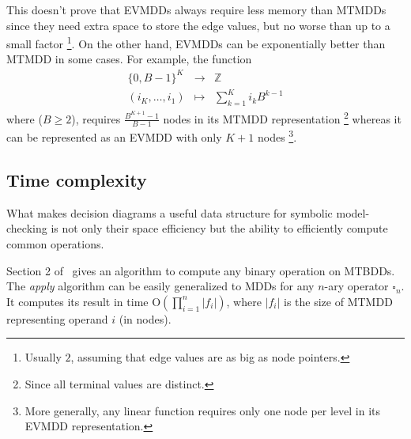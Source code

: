 \documentclass[a4paper,oneside,11pt,pdftex]{llncs}
\renewcommand{\O}[1]{\mathrm{O}\left(#1\right)}
\newcommand{\Z}{\mathbb{Z}}
\begin{document}
This doesn't prove that EVMDDs always require less memory than MTMDDs since
they need extra space to store the edge values, but no worse than up to a small factor
\footnote{Usually $2$, assuming that edge values are as
big as node pointers.}. On the other hand, EVMDDs can be exponentially better than
MTMDD in some cases. For example, the function
$$
\begin{array}{rcl}
  \{0, B-1\}^K&\rightarrow&\Z\\
  (i_K,\ldots, i_1)&\mapsto&\sum_{k=1}^{K} i_k B^{k-1}
\end{array}
$$
where ($B \geq 2$),
requires $\frac{B^{K+1}-1}{B-1}$ nodes in its MTMDD representation%
\footnote{Since all terminal values are distinct.}
whereas it can be represented as an EVMDD with only $K+1$ nodes%
\footnote{More generally, any linear function requires only
one node per level in its EVMDD representation.}.

\subsection{Time complexity%
  \label{subsection-time-complexity}}

What makes decision diagrams a useful data structure
for symbolic model-checking is not only their space efficiency
but the ability to efficiently compute common operations.

Section 2 of~\cite{Clarke1995} gives an algorithm to compute any
binary operation on MTBDDs. The \emph{apply} algorithm can be
easily generalized to MDDs for any
$n$-ary operator $\square_n$. It computes its result in time
$\O{\prod_{i=1}^n |f_i|}$, where $|f_i|$ is the size of MTMDD representing
operand $i$ (in nodes).
\end{document}
